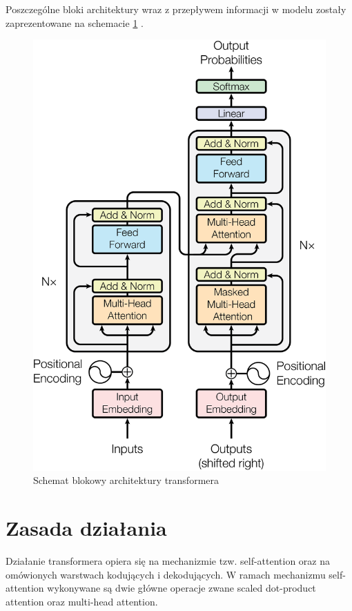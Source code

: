 \documentclass[12pt,a4paper,twoside]{book} %
\begin{document}
Poszczególne bloki architektury wraz z przepływem informacji w modelu zostały zaprezentowane na schemacie \ref{fig:transformer_architecture} \cite{vaswani2023attentionneed}.

\begin{figure}[H]
    \centering
	\includegraphics[scale=0.20]{figs/architecture.png}
	\caption{Schemat blokowy architektury transformera}
	\label{fig:transformer_architecture}
\end{figure}

\section{Zasada działania}
Działanie transformera opiera się na mechanizmie tzw. self-attention oraz na omówionych warstwach kodujących i dekodujących.
W ramach mechanizmu self-attention wykonywane są dwie główne operacje zwane scaled dot-product attention oraz multi-head attention.
\end{document}
